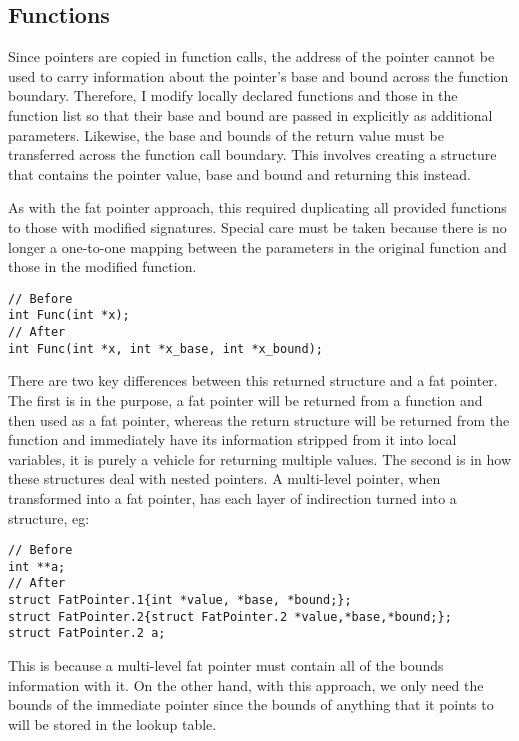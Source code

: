 \subsection{Functions}

Since pointers are copied in function calls, the address of the pointer cannot be used to carry information about the pointer's base and bound across the function boundary.
Therefore, I modify locally declared functions and those in the function list so that their base and bound are passed in explicitly as additional parameters.
Likewise, the base and bounds of the return value must be transferred across the function call boundary.
This involves creating a structure that contains the pointer value, base and bound and returning this instead.

As with the fat pointer approach, this required duplicating all provided functions to those with modified signatures.
Special care must be taken because there is no longer a one-to-one mapping between the parameters in the original function and those in the modified function.

\begin{verbatim}
// Before
int Func(int *x);
// After
int Func(int *x, int *x_base, int *x_bound);
\end{verbatim}

There are two key differences between this returned structure and a fat pointer.
The first is in the purpose, a fat pointer will be returned from a function and then used as a fat pointer, whereas the return structure will be returned from the function and immediately have its information stripped from it into local variables, it is purely a vehicle for returning multiple values.
The second is in how these structures deal with nested pointers.
A multi-level pointer, when transformed into a fat pointer, has each layer of indirection turned into a structure, eg:

\begin{verbatim}
// Before
int **a;
// After
struct FatPointer.1{int *value, *base, *bound;};
struct FatPointer.2{struct FatPointer.2 *value,*base,*bound;};
struct FatPointer.2 a;
\end{verbatim}

This is because a multi-level fat pointer must contain all of the bounds information with it.
On the other hand, with this approach, we only need the bounds of the immediate pointer since the bounds of anything that it points to will be stored in the lookup table.

